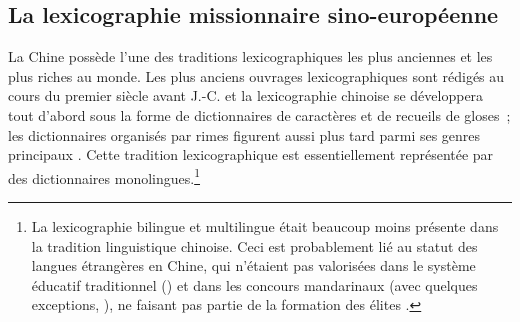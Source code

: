 \documentclass[output=paper,colorlinks,citecolor=brown,arabicfont,chinesefont,booklanguage=french]{langscibook}
\begin{document}
\begin{otherlanguage}{french}
\section{La lexicographie missionnaire sino-européenne}
\largerpage
La Chine possède l’une des traditions lexicographiques les plus anciennes et les plus riches au monde. Les plus anciens ouvrages lexicographiques sont rédigés au cours du premier siècle avant J.-C. \citep{Bottero2019} et la lexicographie chinoise se développera tout d’abord sous la forme de dictionnaires de caractères et de recueils de gloses~; les dictionnaires organisés par rimes figurent aussi plus tard parmi ses genres principaux \citep{Vedal2019}. Cette tradition lexicographique est essentiellement représentée par des dictionnaires monolingues.\footnote{La lexicographie bilingue et multilingue était beaucoup moins présente dans la tradition linguistique chinoise. Ceci est probablement lié au statut des langues étrangères en Chine, qui n’étaient pas valorisées dans le système éducatif traditionnel (\cites[28]{Peverelli1986}[40]{Pellin2009}) et dans les concours mandarinaux (avec quelques exceptions, \citealt[166--167, 223]{Elman2000}), ne faisant pas partie de la formation des élites \citep[358]{Lackner2001}.}


\end{otherlanguage}
\end{document}
